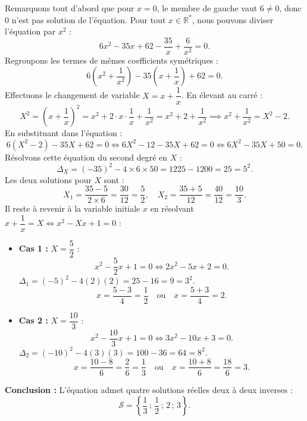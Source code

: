 \documentclass[11pt,a4paper]{article}
\newcommand{\R}{\mathbb{R}}
\begin{document}
\begin{correctionbox}
Remarquons tout d'abord que pour $x = 0$, le membre de gauche vaut $6 \ne 0$, donc $0$ n'est pas solution de l'équation.
Pour tout $x \in \R^*$, nous pouvons diviser l'équation par $x^2$ :
\[
6x^2 - 35x + 62 - \frac{35}{x} + \frac{6}{x^2} = 0.
\]
Regroupons les termes de mêmes coefficients symétriques :
\[
6\left(x^2 + \frac{1}{x^2}\right) - 35\left(x + \frac{1}{x}\right) + 62 = 0.
\]
Effectuons le changement de variable $X = x + \dfrac{1}{x}$. En élevant au carré :
\[
X^2 = \left(x + \frac{1}{x}\right)^2 = x^2 + 2 \cdot x \cdot \frac{1}{x} + \frac{1}{x^2} = x^2 + 2 + \frac{1}{x^2} \implies x^2 + \frac{1}{x^2} = X^2 - 2.
\]
En substituant dans l'équation :
\[
6(X^2 - 2) - 35X + 62 = 0 \iff 6X^2 - 12 - 35X + 62 = 0 \iff 6X^2 - 35X + 50 = 0.
\]
Résolvons cette équation du second degré en $X$ :
\[
\Delta_X = (-35)^2 - 4 \times 6 \times 50 = 1225 - 1200 = 25 = 5^2.
\]
Les deux solutions pour $X$ sont :
\[
X_1 = \frac{35 - 5}{2 \times 6} = \frac{30}{12} = \frac{5}{2}, \quad X_2 = \frac{35 + 5}{12} = \frac{40}{12} = \frac{10}{3}.
\]
Il reste à revenir à la variable initiale $x$ en résolvant $x + \dfrac{1}{x} = X \iff x^2 - Xx + 1 = 0$ :
\begin{itemize}
    \item \textbf{Cas 1 :} $X = \dfrac{5}{2}$ :
    \[
    x^2 - \frac{5}{2}x + 1 = 0 \iff 2x^2 - 5x + 2 = 0.
    \]
    $\Delta_1 = (-5)^2 - 4(2)(2) = 25 - 16 = 9 = 3^2$.
    \[
    x = \frac{5 - 3}{4} = \frac{1}{2} \quad \text{ou} \quad x = \frac{5 + 3}{4} = 2.
    \]
    \item \textbf{Cas 2 :} $X = \dfrac{10}{3}$ :
    \[
    x^2 - \frac{10}{3}x + 1 = 0 \iff 3x^2 - 10x + 3 = 0.
    \]
    $\Delta_2 = (-10)^2 - 4(3)(3) = 100 - 36 = 64 = 8^2$.
    \[
    x = \frac{10 - 8}{6} = \frac{2}{6} = \frac{1}{3} \quad \text{ou} \quad x = \frac{10 + 8}{6} = \frac{18}{6} = 3.
    \]
\end{itemize}
\textbf{Conclusion :} L'équation admet quatre solutions réelles deux à deux inverses :
\[
\mathcal{S} = \left\{\frac{1}{3}\,;\, \frac{1}{2}\,;\, 2\,;\, 3\right\}.
\]
\end{correctionbox}
\end{document}
